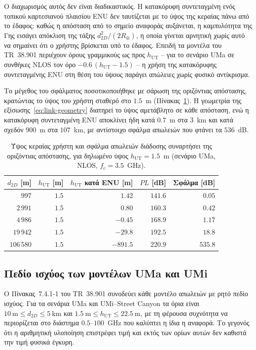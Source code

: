 Ο διαχωρισμός αυτός δεν είναι διαδικαστικός. Η κατακόρυφη συντεταγμένη
ενός τοπικού καρτεσιανού πλαισίου ENU δεν ταυτίζεται με το ύψος της
κεραίας πάνω από το έδαφος: καθώς η απόσταση από το σημείο αναφοράς
αυξάνεται, η καμπυλότητα της Γης εισάγει απόκλιση της τάξης
$d_{2D}^{2}/(2R_\oplus)$, η οποία γίνεται αρνητική χωρίς αυτό να σημαίνει
ότι ο χρήστης βρίσκεται υπό το έδαφος. Επειδή τα μοντέλα του TR~38.901
περιέχουν όρους γραμμικούς ως προς $h_{\text{UT}}$ -- για το σενάριο UMa
σε συνθήκες NLOS τον όρο $-0.6\,(h_{\text{UT}} - 1.5)$ -- η χρήση της
κατακόρυφης συντεταγμένης ENU στη θέση του ύψους παράγει απώλειες χωρίς
φυσικό αντίκρισμα.

Το μέγεθος του σφάλματος ποσοτικοποιήθηκε με σάρωση της οριζόντιας
απόστασης, κρατώντας το ύψος του χρήστη σταθερό στο $1.5$~m
(Πίνακας~\ref{tab:geometry-check}). Η γεωμετρία της
εξίσωσης~\eqref{eq:link-geometry} διατηρεί το ύψος αμετάβλητο σε κάθε
απόσταση, ενώ η κατακόρυφη συντεταγμένη ENU αποκλίνει ήδη κατά $0.7$~m στα
$3$~km και κατά σχεδόν $900$~m στα $107$~km, με αντίστοιχο σφάλμα απωλειών
που φτάνει τα $536$~dB.

\begin{table}[htbp]
\centering
\caption{Ύψος κεραίας χρήστη και σφάλμα απωλειών διάδοσης συναρτήσει της
οριζόντιας απόστασης, για δηλωμένο ύψος $h_{\text{UT}} = 1.5$~m (σενάριο
UMa, NLOS, $f_c = 3.5$~GHz).}
\label{tab:geometry-check}
\small
\begin{tabular}{@{}rrrrr@{}}
\toprule
$d_{2D}$ [m] & $h_{\text{UT}}$ [m] & $h_{\text{UT}}$ κατά ENU [m]
& $PL$ [dB] & Σφάλμα [dB] \\
\midrule
$997$      & $1.5$ & $1.42$    & $141.6$ & $0.05$ \\
$2\,991$   & $1.5$ & $0.80$    & $160.3$ & $0.42$ \\
$4\,986$   & $1.5$ & $-0.45$   & $168.9$ & $1.17$ \\
$19\,942$  & $1.5$ & $-29.8$   & $192.5$ & $18.8$ \\
$106\,580$ & $1.5$ & $-891.5$  & $220.9$ & $535.8$ \\
\bottomrule
\end{tabular}
\end{table}

\subsection{Πεδίο ισχύος των μοντέλων UMa και UMi}
\label{subsec:meth-validity}

Ο Πίνακας~7.4.1-1 του TR~38.901 συνοδεύει κάθε μοντέλο απωλειών με ρητό
πεδίο ισχύος. Για τα σενάρια UMa και UMi--Street Canyon τα όρια είναι
$10~\text{m} \le d_{2D} \le 5~\text{km}$ και $1.5~\text{m} \le
h_{\text{UT}} \le 22.5~\text{m}$, με τη φέρουσα συχνότητα να περιορίζεται
στο διάστημα $0.5$--$100$~GHz που καλύπτει η ίδια η αναφορά. Το γεγονός
ότι η αριθμητική υλοποίηση επιστρέφει τιμή και εκτός των ορίων αυτών δεν
καθιστά την τιμή φυσικά έγκυρη.

